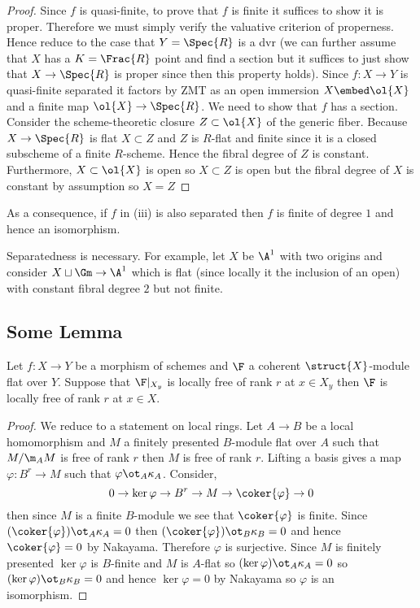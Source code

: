 \documentclass[12pt]{article}
\begin{document}
\begin{proof}
Since $f$ is quasi-finite, to prove that $f$ is finite it suffices to show it is proper. Therefore we must simply verify the valuative criterion of properness. Hence reduce to the case that $Y = \Spec{R}$ is a dvr (we can further assume that $X$ has a $K = \Frac{R}$ point and find a section but it suffices to just show that $X \to \Spec{R}$ is proper since then this property holds). Since $f : X \to Y$ is quasi-finite separated it factors by ZMT as an open immersion $X \embed \ol{X}$ and a finite map $\ol{X} \to \Spec{R}$. We need to show that $f$ has a section. Consider the scheme-theoretic closure $Z \subset \ol{X}$ of the generic fiber. Because $X \to \Spec{R}$ is flat $X \subset Z$ and $Z$ is $R$-flat and finite since it is a closed subscheme of a finite $R$-scheme. Hence the fibral degree of $Z$ is constant. Furthermore, $X \subset \ol{X}$ is open so $X \subset Z$ is open but the fibral degree of $X$ is constant by assumption so $X = Z$ 
\end{proof}

As a consequence, if $f$ in (iii) is also separated then $f$ is finite of degree $1$ and hence an isomorphism.

\begin{rmk}
Separatedness is necessary. For example, let $X$ be $\A^1$ with two origins and consider $X \sqcup \Gm \to \A^1$ which is flat (since locally it the inclusion of an open) with constant fibral degree $2$ but not finite.
\end{rmk}

\subsection{Some Lemma}

\begin{lemma}
Let $f : X \to Y$ be a morphism of schemes and $\F$ a coherent $\struct{X}$-module flat over $Y$. Suppose that $\F|_{X_y}$ is locally free of rank $r$ at $x \in X_y$ then $\F$ is locally free of rank $r$ at $x \in X$.
\end{lemma}

\begin{proof}
We reduce to a statement on local rings. Let $A \to B$ be a local homomorphism and $M$ a finitely presented $B$-module flat over $A$ such that $M / \m_A M$ is free of rank $r$ then $M$ is free of rank $r$. Lifting a basis gives a map $\varphi : B^r \to M$ such that $\varphi \ot_A \kappa_A$. Consider,
\[ 0 \to \ker{\varphi} \to B^r \to M \to \coker{\varphi} \to 0 \]
then since $M$ is a finite $B$-module we see that $\coker{\varphi}$ is finite. Since $(\coker{\varphi}) \ot_A \kappa_A = 0$ then $(\coker{\varphi}) \ot_B \kappa_B = 0$ and hence $\coker{\varphi} = 0$ by Nakayama. Therefore $\varphi$ is surjective. Since $M$ is finitely presented $\ker{\varphi}$ is $B$-finite and $M$ is $A$-flat so $(\ker{\varphi}) \ot_A \kappa_A = 0$ so $(\ker{\varphi}) \ot_B \kappa_B = 0$ and hence $\ker{\varphi} = 0$ by Nakayama so $\varphi$ is an isomorphism.
\end{proof}
\end{document}
